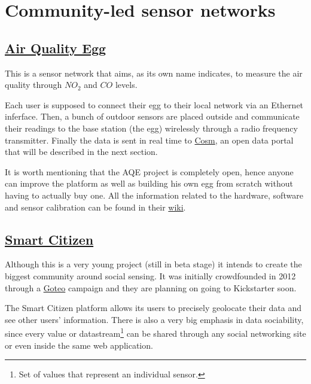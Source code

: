 \section{Community-led sensor networks}

%
%

\subsection{\href{http://www.aiqualityegg.com}{Air Quality Egg}}

This is a sensor network that aims, as its own name indicates, to measure the air quality through $NO_{2}$ and $CO$ levels.

Each user is supposed to connect their egg to their local network via an Ethernet inferface. Then, a bunch of outdoor sensors are placed outside and communicate their readings to the base station (the egg) wirelessly through a radio frequency transmitter. Finally the data is sent in real time to \href{http://www.cosm.com}{Cosm}, an open data portal that will be described in the next section.

It is worth mentioning that the AQE project is completely open, hence anyone can improve the platform as well as building his own egg from scratch without having to actually buy one. All the information related to the hardware, software and sensor calibration can be found in their \href{http://airqualityegg.wikispaces.org}{wiki}.

\subsection{\href{http://beta.smartcitizen.me}{Smart Citizen}}

Although this is a very young project (still in beta stage) it intends to create the biggest community around social sensing. It was initially crowdfounded in 2012 through a \href{http://goteo.org/project/smart-citizen-sensores-ciudadanos}{Goteo} campaign and they are planning on going to Kickstarter soon.

The Smart Citizen platform allows its users to precisely geolocate their data and see other users' information. There is also a very big emphasis in data sociability, since every value or datastream\footnote{Set of values that represent an individual sensor.} can be shared through any social networking site or even inside the same web application.

